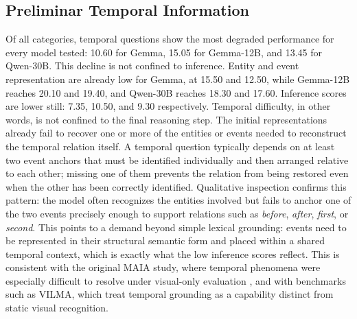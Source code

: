 \subsection*{Preliminar Temporal Information}
\label{subsec:preliminary_temporal}
Of all categories, temporal questions show the most degraded performance for every model tested: 10.60 for Gemma, 15.05 for Gemma-12B, and 13.45 for Qwen-30B. This decline is not confined to inference. Entity and event representation are already low for Gemma, at 15.50 and 12.50, while Gemma-12B reaches 20.10 and 19.40, and Qwen-30B reaches 18.30 and 17.60. Inference scores are lower still: 7.35, 10.50, and 9.30 respectively.
Temporal difficulty, in other words, is not confined to the final reasoning step. The initial representations already fail to recover one or more of the entities or events needed to reconstruct the temporal relation itself. A temporal question typically depends on at least two event anchors that must be identified individually and then arranged relative to each other; missing one of them prevents the relation from being restored even when the other has been correctly identified. Qualitative inspection confirms this pattern: the model often recognizes the entities involved but fails to anchor one of the two events precisely enough to support relations such as \textit{before}, \textit{after}, \textit{first}, or \textit{second}.
This points to a demand beyond simple lexical grounding: events need to be represented in their structural semantic form and placed within a shared temporal context, which is exactly what the low inference scores reflect. This is consistent with the original MAIA study, where temporal phenomena were especially difficult to resolve under visual-only evaluation \cite{testa2025maia}, and with benchmarks such as VILMA, which treat temporal grounding as a capability distinct from static visual recognition.
